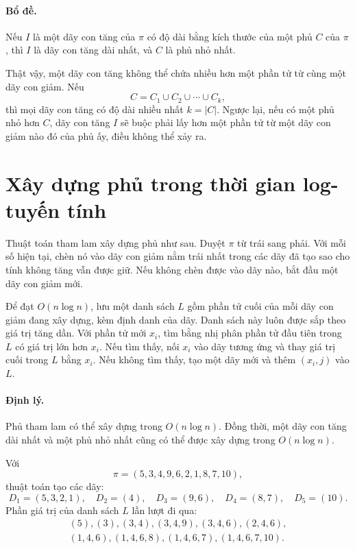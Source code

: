 \documentclass[11pt]{article}
\begin{document}
\paragraph{Bổ đề.}
Nếu \(I\) là một dãy con tăng của \(\pi\) có độ dài bằng kích thước của một
phủ \(C\) của \(\pi\), thì \(I\) là dãy con tăng dài nhất, và \(C\) là phủ nhỏ
nhất.

Thật vậy, một dãy con tăng không thể chứa nhiều hơn một phần tử từ cùng một
dãy con giảm. Nếu
\[
  C=C_1\cup C_2\cup\cdots\cup C_k,
\]
thì mọi dãy con tăng có độ dài nhiều nhất \(k=|C|\). Ngược lại, nếu có một
phủ nhỏ hơn \(C\), dãy con tăng \(I\) sẽ buộc phải lấy hơn một phần tử từ một
dãy con giảm nào đó của phủ ấy, điều không thể xảy ra.

\section{Xây dựng phủ trong thời gian log-tuyến tính}

Thuật toán tham lam xây dựng phủ như sau. Duyệt \(\pi\) từ trái sang phải. Với
mỗi số hiện tại, chèn nó vào dãy con giảm nằm trái nhất trong các dãy đã tạo
sao cho tính không tăng vẫn được giữ. Nếu không chèn được vào dãy nào, bắt đầu
một dãy con giảm mới.

Để đạt \(O(n\log n)\), lưu một danh sách \(L\) gồm phần tử cuối của mỗi dãy
con giảm đang xây dựng, kèm định danh của dãy. Danh sách này luôn được sắp
theo giá trị tăng dần. Với phần tử mới \(x_i\), tìm bằng nhị phân phần tử đầu
tiên trong \(L\) có giá trị lớn hơn \(x_i\). Nếu tìm thấy, nối \(x_i\) vào
dãy tương ứng và thay giá trị cuối trong \(L\) bằng \(x_i\). Nếu không tìm
thấy, tạo một dãy mới và thêm \((x_i,j)\) vào \(L\).

\paragraph{Định lý.}
Phủ tham lam có thể xây dựng trong \(O(n\log n)\). Đồng thời, một dãy con tăng
dài nhất và một phủ nhỏ nhất cũng có thể được xây dựng trong \(O(n\log n)\).

Với
\[
  \pi=(5,3,4,9,6,2,1,8,7,10),
\]
thuật toán tạo các dãy:
\[
  D_1=(5,3,2,1),\quad D_2=(4),\quad D_3=(9,6),\quad
  D_4=(8,7),\quad D_5=(10).
\]
Phần giá trị của danh sách \(L\) lần lượt đi qua:
\[
\begin{gathered}
(5),(3),(3,4),(3,4,9),(3,4,6),(2,4,6),\\
(1,4,6),(1,4,6,8),(1,4,6,7),(1,4,6,7,10).
\end{gathered}
\]
\end{document}
